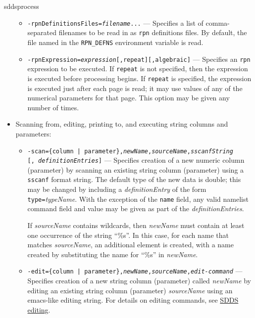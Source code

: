 \begin{sddsprog}{sddsprocess}
\begin{itemize}
        \begin{itemize} \item {\tt -rpnDefinitionsFiles={\em filename}...} --- Specifies a list of comma-separated
filenames to be read in as \verb|rpn| definitions files.  By default, the file named in the {\tt RPN\_DEFNS}
environment variable is read.

        \item {\tt -rpnExpression={\em expression}[,repeat][,algebraic]} --- Specifies an \verb|rpn| expression to be executed.  If
{\tt repeat} is not specified, then the expression is executed before processing begins.  If {\tt repeat} is specified,
the expression is executed just after each page is read; it may use values of any of the numerical parameters for that
page. This option may be given any number of times.

        \end{itemize}
  \item Scanning from, editing, printing to, and executing string columns and parameters: \\

         \begin{itemize}
 
         \item {\tt -scan=\{column | parameter\},{\em newName},{\em sourceName},{\em sscanfString}}\\ {\tt [,{\em
 definitionEntries}]} --- Specifies creation of a new numeric column (parameter) by scanning an existing string column
 (parameter) using a \verb|sscanf| format string.  The default type of the new data is double; this may be changed by
 including a {\em definitionEntry} of the form {\tt type=}{\em typeName}.  With the exception of the {\tt name} field,
 any valid namelist command field and value may be given as part of the {\em definitionEntries}.

        If {\em sourceName} contains wildcards, then {\em newName} must contain at least one occurrence of the string
``\%s''.  In this case, for each name that matches {\em sourceName}, an additional element is created, with a
name created by substituting the name for ``\%s'' in {\em newName}.
 
         \item {\tt -edit=\{column | parameter\},{\em newName},{\em sourceName},{\em edit-command}} --- Specifies
creation of a new string column (parameter) called {\em newName} by editing an existing string column (parameter) {\em
sourceName} using an emacs-like editing string.  For details on editing commands, see \hyperref[SDDSediting]{SDDS editing}.
         

\end{itemize}
\end{itemize}
\end{sddsprog}
